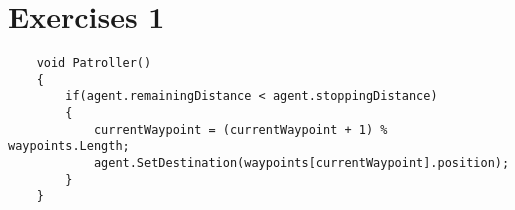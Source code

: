 \section{Exercises 1}

\begin{verbatim}
    void Patroller()
    {
        if(agent.remainingDistance < agent.stoppingDistance)
        {
            currentWaypoint = (currentWaypoint + 1) % waypoints.Length;
            agent.SetDestination(waypoints[currentWaypoint].position);
        }
    }
\end{verbatim}